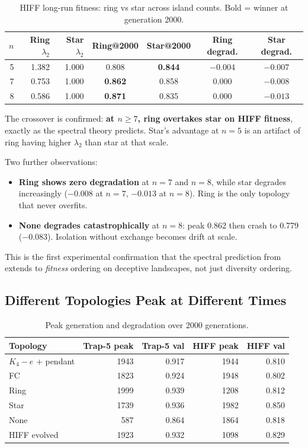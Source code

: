 \documentclass[sigconf,nonacm]{acmart}
\begin{document}
\begin{table}[h]
\caption{HIFF long-run fitness: ring vs star across island counts.
  Bold = winner at generation 2000.}
\label{tab:crossover}
\centering
\begin{tabular}{rrrcccc}
\toprule
$n$ & Ring $\lambda_2$ & Star $\lambda_2$ & Ring@2000 & Star@2000 & Ring degrad. & Star degrad. \\
\midrule
5 & 1.382 & 1.000 & 0.808 & \textbf{0.844} & $-0.004$ & $-0.007$ \\
7 & 0.753 & 1.000 & \textbf{0.862} & 0.858 & $\mathbf{0.000}$ & $-0.008$ \\
8 & 0.586 & 1.000 & \textbf{0.871} & 0.835 & $\mathbf{0.000}$ & $-0.013$ \\
\bottomrule
\end{tabular}
\end{table}

The crossover is confirmed: \textbf{at $n \geq 7$, ring overtakes star
on HIFF fitness}, exactly as the spectral theory predicts. Star's
advantage at $n = 5$ is an artifact of ring having higher $\lambda_2$
than star at that scale.

Two further observations:
\begin{itemize}
\item \textbf{Ring shows zero degradation} at $n = 7$ and $n = 8$,
  while star degrades increasingly ($-0.008$ at $n=7$, $-0.013$ at
  $n=8$). Ring is the only topology that never overfits.
\item \textbf{None degrades catastrophically} at $n=8$: peak 0.862
  then crash to 0.779 ($-0.083$). Isolation without exchange becomes
  drift at scale.
\end{itemize}

This is the first experimental confirmation that the spectral
prediction from~\cite{langer2026} extends to \emph{fitness} ordering
on deceptive landscapes, not just diversity ordering.

\subsection{Different Topologies Peak at Different Times}

\begin{table}[h]
\caption{Peak generation and degradation over 2000 generations.}
\label{tab:peaks}
\centering
\begin{tabular}{lrrrr}
\toprule
\textbf{Topology} & \textbf{Trap-5 peak} & \textbf{Trap-5 val} & \textbf{HIFF peak} & \textbf{HIFF val} \\
\midrule
$K_4{-}e$ + pendant  & 1943 & 0.917 & 1944 & 0.810 \\
FC                   & 1823 & 0.924 & 1948 & 0.802 \\
Ring                 & 1999 & 0.939 & 1208 & 0.812 \\
Star                 & 1739 & 0.936 & 1982 & 0.850 \\
None                 &  587 & 0.864 & 1864 & 0.818 \\
HIFF evolved         & 1923 & 0.932 & 1098 & 0.829 \\
\bottomrule
\end{tabular}
\end{table}
\end{document}
